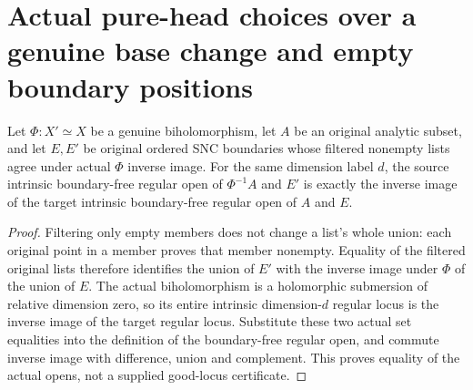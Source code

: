 \section{Actual pure-head choices over a genuine base change and empty boundary positions}

\begin{lemma}
\label{hir:original-pure-head-good-open-empty-base}
\leanok
Let $\Phi:X'\simeq X$ be a genuine biholomorphism, let $A$ be an original
analytic subset, and let $E,E'$ be original ordered SNC boundaries whose
filtered nonempty lists agree under actual $\Phi$ inverse image. For the
same dimension label $d$, the source intrinsic boundary-free regular open
of $\Phi^{-1}A$ and $E'$ is exactly the inverse image of the target
intrinsic boundary-free regular open of $A$ and $E$.
\end{lemma}
\begin{proof}
Filtering only empty members does not change a list's whole union: each
original point in a member proves that member nonempty. Equality of the
filtered original lists therefore identifies the union of $E'$ with the
inverse image under $\Phi$ of the union of $E$. The actual biholomorphism
is a holomorphic submersion of relative dimension zero, so its entire
intrinsic dimension-$d$ regular locus is the inverse image of the target
regular locus. Substitute these two actual set equalities into the
definition of the boundary-free regular open, and commute inverse image
with difference, union and complement. This proves equality of the
actual opens, not a supplied good-locus certificate.
\end{proof}

